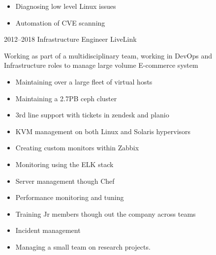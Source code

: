 \documentclass[]{friggeri-cv-a4}
\begin{document}
\begin{entrylist}
{\begin{itemize}
        \item Diagnosing low level Linux issues
        \item Automation of CVE scanning
      \end{itemize}
    }
   \entry
  	{2012--2018}
  	{Infrastructure Engineer}
  	{LiveLink}
  	{
      Working as part of a multidisciplinary team, working in DevOps and Infrastructure roles to manage large volume E-commerce system
      \begin{itemize}
        \item Maintaining over a large fleet of virtual hosts
        \item Maintaining a 2.7PB ceph cluster
        \item 3rd line support with tickets in zendesk and planio
        \item KVM management on both Linux and Solaris hypervisors
        \item Creating custom monitors within Zabbix
        \item Monitoring using the ELK stack
        \item Server management though Chef
        \item Performance monitoring and tuning
        \item Training Jr members though out the company across teams
        \item Incident management
        \item Managing a small team on research projects.
      \end{itemize}
    }
 \end{entrylist}
\end{document}
